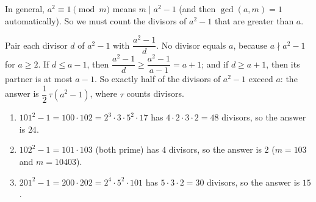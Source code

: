 In general, $a^2\equiv1\pmod m$ means $m\mid a^2-1$ (and then $\gcd(a,m)=1$ automatically). So we must count the divisors of $a^2-1$ that are greater than $a$.

Pair each divisor $d$ of $a^2-1$ with $\dfrac{a^2-1}{d}$. No divisor equals $a$, because $a\nmid a^2-1$ for $a\ge2$. If $d\le a-1$, then $\dfrac{a^2-1}{d}\ge\dfrac{a^2-1}{a-1}=a+1$; and if $d\ge a+1$, then its partner is at most $a-1$. So exactly half of the divisors of $a^2-1$ exceed $a$: the answer is $\dfrac12\,\tau\!\left(a^2-1\right)$, where $\tau$ counts divisors.
\begin{enumerate}
\item[(a)] $101^2-1=100\cdot102=2^3\cdot3\cdot5^2\cdot17$ has $4\cdot2\cdot3\cdot2=48$ divisors, so the answer is $\boxed{24}$.
\item[(b)] $102^2-1=101\cdot103$ (both prime) has $4$ divisors, so the answer is $\boxed{2}$ ($m=103$ and $m=10403$).
\item[(c)] $201^2-1=200\cdot202=2^4\cdot5^2\cdot101$ has $5\cdot3\cdot2=30$ divisors, so the answer is $\boxed{15}$.
\end{enumerate}
